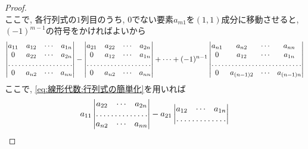 \documentclass[a4j,dvipdfmx]{jsarticle}
\numberwithin{equation}{section}
\begin{document}
\begin{proof}
\begin{equation*}
                \end{equation*}
                ここで, 各行列式の$1$列目のうち, $0$でない要素$a_{m1}$を$(1,1)$成分に移動させると, $(-1)^{m-1}$の符号をかければよいから
                \begin{equation*}
                    \begin{vmatrix}
                        a_{11} & a_{12} & \cdots & a_{1n}\\
                        0 & a_{22} & \cdots & a_{2n}\\
                        \hdotsfor{4}\\
                        0 & a_{n2} & \cdots & a_{nn}
                    \end{vmatrix}
                    -\begin{vmatrix}
                        a_{21} & a_{22} & \cdots & a_{2n}\\
                        0 & a_{12} & \cdots & a_{1n}\\
                        \hdotsfor{4}\\
                        0 & a_{n2} & \cdots & a_{nn}
                    \end{vmatrix}
                    +\cdots
                    +(-1)^{n-1}\begin{vmatrix}
                        a_{n1} & a_{n2} & \cdots & a_{nn}\\
                        0 & a_{12} & \cdots & a_{1n}\\
                        \hdotsfor{4}\\
                        0 & a_{(n-1)2} & \cdots & a_{(n-1)n}\\
                    \end{vmatrix}
                \end{equation*}
                ここで, \eqref{eq:線形代数:行列式の簡単化}を用いれば
                \begin{equation*}
                    a_{11}\begin{vmatrix}
                        a_{22} & \cdots & a_{2n}\\
                        \hdotsfor{3}\\
                        a_{n2} & \cdots & a_{nn}
                    \end{vmatrix}
                    -a_{21}\begin{vmatrix}
                        a_{12} & \cdots & a_{1n}\\
                        \hdotsfor{3}\\

\end{vmatrix}
\end{equation*}
\end{proof}
\end{document}
